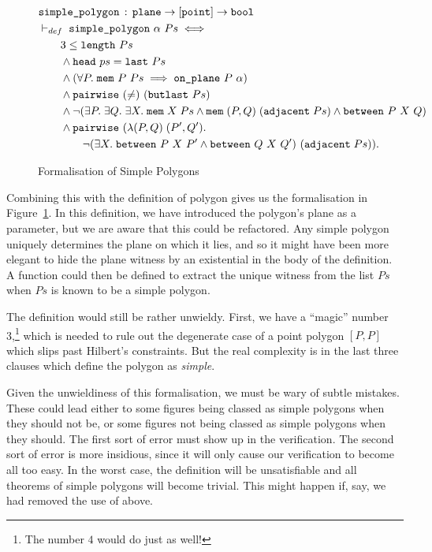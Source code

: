 \begin{figure}
\begin{equation}\label{eq:SimplePolygonDef}
  \begin{split}
  &\texttt{simple\_polygon}\,:\,\texttt{plane} \rightarrow [\texttt{point}] \rightarrow \texttt{bool}\\
  &\vdash_{def}\;\texttt{simple\_polygon}\ \alpha\ Ps \iff \\
  &\qquad 3 \leq \texttt{length}\ Ps\\
  &\qquad\wedge \texttt{head}\ ps = \texttt{last}\ Ps\\
  &\qquad\wedge (\forall P.\;\texttt{mem}\ P\ Ps \implies \texttt{on\_plane}\ P\ \alpha)\\
  &\qquad\wedge \texttt{pairwise}\ (\neq)\ (\texttt{butlast}\ Ps)\\
  &\qquad\wedge \neg(\exists P.\;\exists Q.\;\exists X.\; \texttt{mem}\;X\;Ps\wedge\texttt{mem}\;(P,Q)\;(\texttt{adjacent}\;Ps)\wedge\texttt{between}\ P\ X\ Q)\\
  &\qquad\wedge \texttt{pairwise}\ (\lambda(P,Q)\;(P',Q').\\
  &\qquad\qquad\neg(\exists X.\;\texttt{between}\ P\ X\ P' \wedge \texttt{between}\ Q\ X\ Q')\ (\texttt{adjacent}\;Ps)).
  \end{split}
\end{equation}
\caption{Formalisation of Simple Polygons}
\label{fig:SimplePolygonDef}
\end{figure}

Combining this with the definition of polygon gives us the formalisation in Figure~\ref{fig:SimplePolygonDef}. In this definition, we have introduced the polygon's plane as a parameter, but we are aware that this could be refactored. Any simple polygon uniquely determines the plane on which it lies, and so it might have been more elegant to hide the plane witness by an existential in the body of the definition. A function could then be defined to extract the unique witness from the list $Ps$ when $Ps$ is known to be a simple polygon. 

The definition would still be rather unwieldy. First, we have a ``magic'' number 3,\footnote{The number $4$ would do just as well!} which is needed to rule out the degenerate case of a point polygon $[P,P]$ which slips past Hilbert's constraints. But the real complexity is in the last three clauses which define the polygon as \emph{simple}. 

Given the unwieldiness of this formalisation, we must be wary of subtle mistakes. These could lead either to some figures being classed as simple polygons when they should not be, or some figures not being classed as simple polygons when they should. The first sort of error must show up in the verification. The second sort of error is more insidious, since it will only cause our verification to become all too easy. In the worst case, the definition will be unsatisfiable and all theorems of simple polygons will become trivial. This might happen if, say, we had removed the use of  above.

